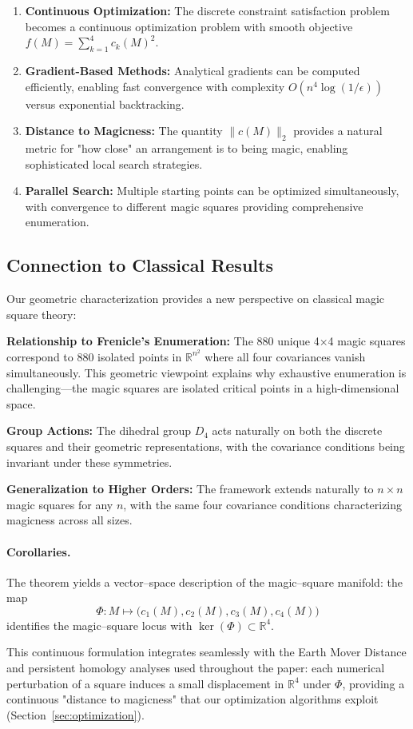 \begin{enumerate}
    \item \textbf{Continuous Optimization:} The discrete constraint satisfaction problem becomes a continuous optimization problem with smooth objective $f(M) = \sum_{k=1}^4 c_k(M)^2$.

    \item \textbf{Gradient-Based Methods:} Analytical gradients can be computed efficiently, enabling fast convergence with complexity $O(n^4 \log(1/\epsilon))$ versus exponential backtracking.

    \item \textbf{Distance to Magicness:} The quantity $\|c(M)\|_2$ provides a natural metric for "how close" an arrangement is to being magic, enabling sophisticated local search strategies.

    \item \textbf{Parallel Search:} Multiple starting points can be optimized simultaneously, with convergence to different magic squares providing comprehensive enumeration.
\end{enumerate}

\subsection{Connection to Classical Results}

Our geometric characterization provides a new perspective on classical magic square theory:

\textbf{Relationship to Frenicle's Enumeration:} The 880 unique 4×4 magic squares correspond to 880 isolated points in $\mathbb{R}^{n^2}$ where all four covariances vanish simultaneously. This geometric viewpoint explains why exhaustive enumeration is challenging—the magic squares are isolated critical points in a high-dimensional space.

\textbf{Group Actions:} The dihedral group $D_4$ acts naturally on both the discrete squares and their geometric representations, with the covariance conditions being invariant under these symmetries.

\textbf{Generalization to Higher Orders:} The framework extends naturally to $n \times n$ magic squares for any $n$, with the same four covariance conditions characterizing magicness across all sizes.

\paragraph{Corollaries.}  The theorem yields a vector–space description of the magic–square manifold: the map
\[\Phi:M\mapsto \bigl(c_1(M), c_2(M), c_3(M), c_4(M)\bigr)\]
identifies the magic–square locus with $\ker(\Phi) \subset \mathbb{R}^4$.

This continuous formulation integrates seamlessly with the Earth Mover Distance and persistent homology analyses used throughout the paper: each numerical perturbation of a square induces a small displacement in $\mathbb{R}^4$ under $\Phi$, providing a continuous "distance to magicness" that our optimization algorithms exploit (Section~\ref{sec:optimization}). 
